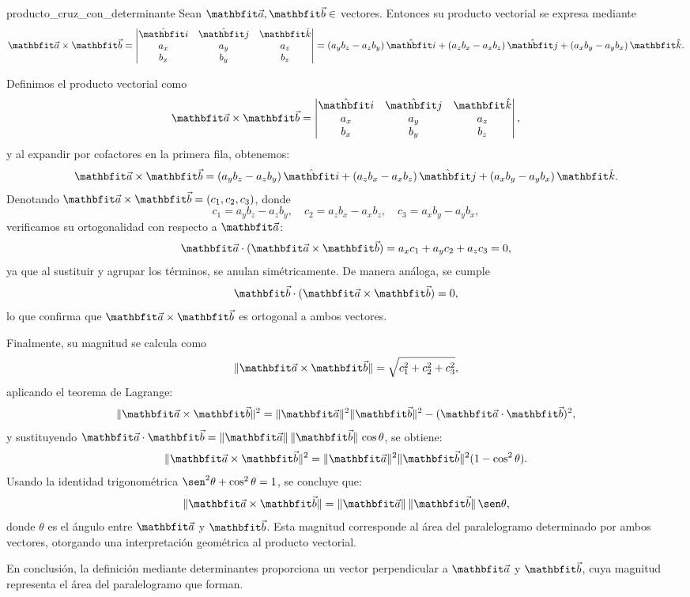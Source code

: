 \begin{theorem}{}{producto_cruz_con_determinante}
    Sean $\veca, \vecb \in$ \RR[3] vectores. Entonces su producto vectorial se expresa mediante
    $$\veca \times \vecb =
    \begin{vmatrix}
        \veci & \vecj & \veck \\
        a_x   & a_y   & a_z   \\
        b_x   & b_y   & b_z
    \end{vmatrix}
    = (a_y b_z - a_z b_y)\,\veci + (a_z b_x - a_x b_z)\,\vecj + (a_x b_y - a_y b_x)\,\veck.$$
    \begin{demo}
        Definimos el producto vectorial como
        $$\veca \times \vecb =
        \begin{vmatrix}
            \veci & \vecj & \veck \\
            a_x   & a_y   & a_z   \\
            b_x   & b_y   & b_z
        \end{vmatrix},$$
        y al expandir por cofactores en la primera fila, obtenemos:
        $$\veca \times \vecb =
        (a_y b_z - a_z b_y)\,\veci
        + (a_z b_x - a_x b_z)\,\vecj
        + (a_x b_y - a_y b_x)\,\veck.$$
        Denotando $\veca \times \vecb = (c_1, c_2, c_3)$, donde
        $$c_1 = a_y b_z - a_z b_y,\quad c_2 = a_z b_x - a_x b_z,\quad c_3 = a_x b_y - a_y b_x,$$
        verificamos su ortogonalidad con respecto a $\veca$:
        $$\veca \cdot (\veca \times \vecb) = a_x c_1 + a_y c_2 + a_z c_3 = 0,$$
        ya que al sustituir y agrupar los términos, se anulan simétricamente. De manera análoga, se cumple
        $$\vecb \cdot (\veca \times \vecb) = 0,$$
        lo que confirma que $\veca \times \vecb$ es ortogonal a ambos vectores.

        Finalmente, su magnitud se calcula como
        $$\|\veca \times \vecb\| = \sqrt{c_1^2 + c_2^2 + c_3^2},$$
        aplicando el teorema de Lagrange:
        $$\|\veca \times \vecb\|^2 = \|\veca\|^2 \|\vecb\|^2 - (\veca \cdot \vecb)^2,$$
        y sustituyendo \(\veca \cdot \vecb = \|\veca\|\,\|\vecb\|\,\cos\theta\), se obtiene:
        $$\|\veca \times \vecb\|^2 = \|\veca\|^2 \|\vecb\|^2 (1 - \cos^2\theta).$$
        Usando la identidad trigonométrica \(\sen^2\theta + \cos^2\theta = 1\), se concluye que:
        $$\|\veca \times \vecb\| = \|\veca\|\,\|\vecb\|\,\sen\theta,$$
        donde $\theta$ es el ángulo entre $\veca$ y $\vecb$. Esta magnitud corresponde al área del paralelogramo determinado por ambos vectores, otorgando una interpretación geométrica al producto vectorial.

        En conclusión, la definición mediante determinantes proporciona un vector perpendicular a $\veca$ y $\vecb$, cuya magnitud representa el área del paralelogramo que forman.
    \end{demo}
\end{theorem}

